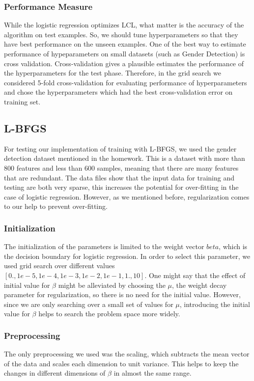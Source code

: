 \documentclass[twoside,12pt]{article}
\begin{document}
\subsubsection{Performance Measure}
While the logistic regression optimizes LCL, what matter is the accuracy of the algorithm on test examples. So, we should tune hyperparameters so that they have best performance on the unseen examples. One of the best way to estimate performance of hypeparameters on small datasets (such as Gender Detection) is cross validation. Cross-validation gives a plausible estimates the performance of the hyperparameters for the test phase. Therefore, in the grid search we considered 5-fold cross-validation for evaluating performance of hyperparameters and chose the hyperparameters which had the best cross-validation error on training set.

\subsection{L-BFGS}
For testing our implementation of training with L-BFGS, we used the gender detection dataset mentioned in the homework. This is a dataset with more than 800 features and less than 600 samples, meaning that there are many features that are redundant. The data files show that the input data for training and testing are both very sparse, this increases the potential for over-fitting in the case of logistic regression. However, as we mentioned before, regularization comes to our help to prevent over-fitting.
\subsubsection{Initialization}
The initialization of the parameters is limited to the weight vector $beta$, which is the decision boundary for logistic regression. In order to select this parameter, we used grid search over different values $[0.,1e-5,1e-4,1e-3,1e-2,1e-1,1.,10]$. One might say that the effect of initial value for $\beta$ might be alleviated by choosing the $\mu$, the weight decay parameter for regularization, so there is no need for the initial value. However, since we are only searching over a small  set of values for $\mu$, introducing the initial value for $\beta$ helps to search the problem space more widely.
\subsubsection{Preprocessing}
The only preprocessing we used was the scaling, which subtracts the mean vector of the data and scales each dimension to unit variance. This helps to keep the changes in different dimensions of $\beta$ in almost the same range.
\end{document}
